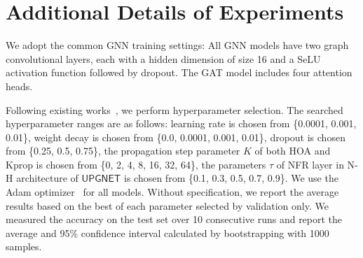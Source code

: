 \documentclass[conference,compsoc]{IEEEtran}
\theoremstyle{boldplain}
\theoremstyle{bolddefinition}
\theoremstyle{remark}
\newcommand{\kprop}{Kprop\xspace}
\newcommand{\hoa}{HOA\xspace}
\newcommand{\upgnet}{\ensuremath{\mathsf{UPGNET}}\xspace}
\newcommand{\nfr}{NFR\xspace}
\begin{document}
\section{Additional Details of Experiments}
\label{app:more_parameter_design}
We adopt the common GNN training settings:
All GNN models have two graph convolutional layers, each with a hidden dimension of size 16 and a SeLU~\cite{klambauer2017selu} activation function followed by dropout. 
The GAT model includes four attention heads. 



Following existing works~\cite{lpgNN,upgnet-cite,privge}, we perform hyperparameter selection. 
The searched hyperparameter ranges are as follows:
learning rate is chosen from \{0.0001, 0.001, 0.01\}, 
weight decay is chosen from \{0.0, 0.0001, 0.001, 0.01\}, 
dropout is chosen from \{0.25, 0.5, 0.75\}, 
the propagation step parameter $K$ of both \hoa and \kprop is chosen from \{0, 2, 4, 8, 16, 32, 64\}, 
the parameters $\tau$ of \nfr layer in N-H architecture of \upgnet is chosen from \{0.1, 0.3, 0.5, 0.7, 0.9\}. 
We use the Adam optimizer~\cite{kingma2014adam} for all models. 
Without specification, we report the average results based on the best of each parameter selected by validation only. 
We measured the accuracy on the test set over 10 consecutive runs and report the average and 95\% confidence interval calculated by bootstrapping with 1000 samples.
\end{document}
